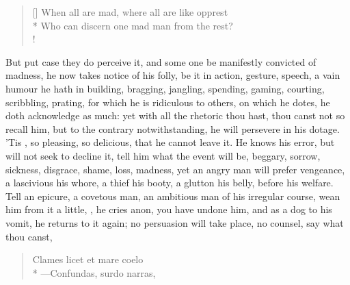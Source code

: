 {\settowidth{\versewidth}{When all are mad, where all are like opprest}
\begin{verse}[\versewidth]
When all are mad, where all are like opprest\\*
Who can discern one mad man from the rest?\\!
\end{verse}

But put case they do perceive it, and some one be manifestly convicted
of madness, he now takes notice of his folly, be it in action,
gesture, speech, a vain humour he hath in building, bragging, jangling,
spending, gaming, courting, scribbling, prating, for which he is
ridiculous to others, on which he dotes, he doth acknowledge as
much: yet with all the rhetoric thou hast, thou canst not so recall
him, but to the contrary notwithstanding, he will persevere in his
dotage. 'Tis , so
pleasing, so delicious, that he cannot leave it. He knows his
error, but will not seek to decline it, tell him what the event will
be, beggary, sorrow, sickness, disgrace, shame, loss, madness, yet
an angry man will prefer vengeance, a lascivious his whore, a
thief his booty, a glutton his belly, before his welfare. Tell an
epicure, a covetous man, an ambitious man of his irregular course, wean
him from it a little, , he cries anon, you have
undone him, and as a dog to his vomit, he returns to it again; no
persuasion will take place, no counsel, say what thou canst,

\begin{verse}
\textlatin{Clames licet et mare coelo}\\*
---\textlatin{Confundas, surdo narras,}
\end{verse}

}
